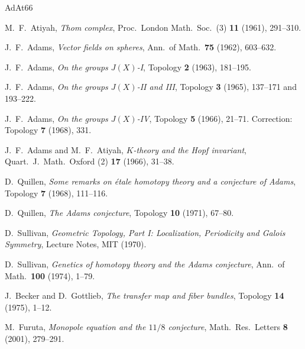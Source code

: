\documentclass[uplatex,dvipdfmx,a4paper,12pt]{jlreq}
\begin{document}
\begin{thebibliography}{AdAt66}

  M.~F.~Atiyah,
  \textit{Thom complex},
  Proc.\ London Math.\ Soc.\ (3) \textbf{11} (1961), 291--310.

  J.~F.~Adams,
  \textit{Vector fields on spheres},
  Ann.\ of Math.\ \textbf{75} (1962), 603--632.

  J.~F.~Adams,
  \textit{On the groups $J(X)$-I},
  Topology \textbf{2} (1963), 181--195.

  J.~F.~Adams,
  \textit{On the groups $J(X)$-II and III},
  Topology \textbf{3} (1965), 137--171 and 193--222.

  J.~F.~Adams,
  \textit{On the groups $J(X)$-IV},
  Topology \textbf{5} (1966), 21--71.
  Correction: Topology \textbf{7} (1968), 331.

  J.~F.~Adams and M.~F.~Atiyah,
  \textit{$K$-theory and the Hopf invariant},
  Quart.\ J.\ Math.\ Oxford (2) \textbf{17} (1966), 31--38.

  D.~Quillen,
  \textit{Some remarks on étale homotopy theory and a conjecture of Adams},
  Topology \textbf{7} (1968), 111--116.

  D.~Quillen,
  \textit{The Adams conjecture},
  Topology \textbf{10} (1971), 67--80.

  D.~Sullivan,
  \textit{Geometric Topology, Part I: Localization, Periodicity and Galois Symmetry},
  Lecture Notes, MIT (1970).

  D.~Sullivan,
  \textit{Genetics of homotopy theory and the Adams conjecture},
  Ann.\ of Math.\ \textbf{100} (1974), 1--79.

  J.~Becker and D.~Gottlieb,
  \textit{The transfer map and fiber bundles},
  Topology \textbf{14} (1975), 1--12.

  M.~Furuta,
  \textit{Monopole equation and the $11/8$ conjecture},
  Math.\ Res.\ Letters \textbf{8} (2001), 279--291.

\end{thebibliography}
\end{document}
